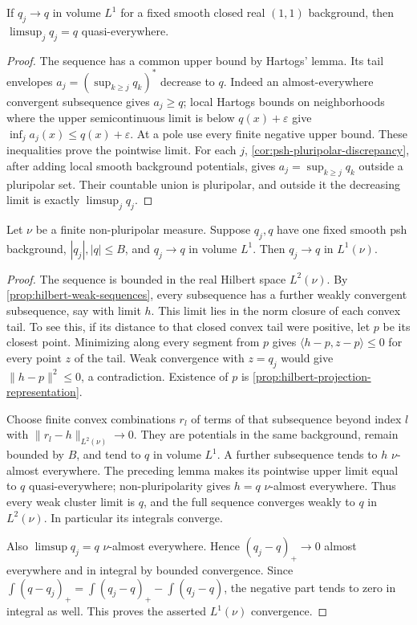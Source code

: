 \begin{lemma}\label{lem:psh-lone-quasieverywhere-limsup}
If $q_j\to q$ in volume $L^1$ for a fixed smooth closed real $(1,1)$ background, then
$\limsup_jq_j=q$ quasi-everywhere.
\end{lemma}
\begin{proof}
The sequence has a common upper bound by Hartogs' lemma. Its tail envelopes $a_j=(\sup_{k\geq j}q_k)^*$ decrease to $q$. Indeed an almost-everywhere convergent subsequence gives $a_j\geq q$; local Hartogs bounds on neighborhoods where the upper semicontinuous limit is below $q(x)+\varepsilon$ give $\inf_ja_j(x)\leq q(x)+\varepsilon$. At a pole use every finite negative upper bound. These inequalities prove the pointwise limit. For each $j$, \cref{cor:psh-pluripolar-discrepancy}, after adding local smooth background potentials, gives $a_j=\sup_{k\geq j}q_k$ outside a pluripolar set. Their countable union is pluripolar, and outside it the decreasing limit is exactly $\limsup_jq_j$.
\end{proof}

\begin{lemma}\label{lem:bounded-psh-nonpluripolar-measure-continuity}
Let $\nu$ be a finite non-pluripolar measure. Suppose $q_j,q$ have one fixed smooth psh background, $|q_j|,|q|\leq B$, and $q_j\to q$ in volume $L^1$. Then $q_j\to q$ in $L^1(\nu)$.
\end{lemma}
\begin{proof}
The sequence is bounded in the real Hilbert space $L^2(\nu)$. By \cref{prop:hilbert-weak-sequences}, every subsequence has a further weakly convergent subsequence, say with limit $h$. This limit lies in the norm closure of each convex tail. To see this, if its distance to that closed convex tail were positive, let $p$ be its closest point. Minimizing along every segment from $p$ gives
$\langle h-p,z-p\rangle\leq0$ for every point $z$ of the tail. Weak convergence with $z=q_j$ would give $\|h-p\|^2\leq0$, a contradiction. Existence of $p$ is \cref{prop:hilbert-projection-representation}.

Choose finite convex combinations $r_l$ of terms of that subsequence beyond index $l$ with $\|r_l-h\|_{L^2(\nu)}\to0$. They are potentials in the same background, remain bounded by $B$, and tend to $q$ in volume $L^1$. A further subsequence tends to $h$ $\nu$-almost everywhere. The preceding lemma makes its pointwise upper limit equal to $q$ quasi-everywhere; non-pluripolarity gives $h=q$ $\nu$-almost everywhere. Thus every weak cluster limit is $q$, and the full sequence converges weakly to $q$ in $L^2(\nu)$. In particular its integrals converge.

Also $\limsup q_j=q$ $\nu$-almost everywhere. Hence $(q_j-q)_+\to0$ almost everywhere and in integral by bounded convergence. Since
$\int(q-q_j)_+=\int(q_j-q)_+-\int(q_j-q)$,
the negative part tends to zero in integral as well. This proves the asserted $L^1(\nu)$ convergence.
\end{proof}

